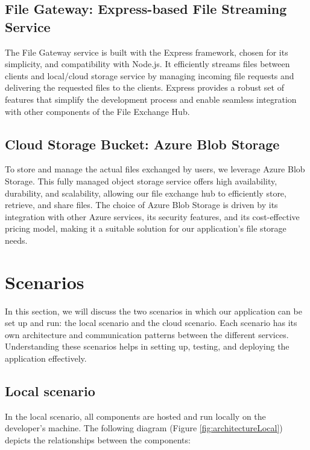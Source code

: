 \documentclass[a4paper,fleqn]{cas-sc}
\begin{document}
\subsection{File Gateway: Express-based File Streaming Service}

The File Gateway service is built with the Express framework, chosen for its simplicity, and compatibility with Node.js. It efficiently streams files between clients and local/cloud storage service by managing incoming file requests and delivering the requested files to the clients. Express provides a robust set of features that simplify the development process and enable seamless integration with other components of the File Exchange Hub.

\subsection{Cloud Storage Bucket: Azure Blob Storage}

To store and manage the actual files exchanged by users, we leverage Azure Blob Storage. This fully managed object storage service offers high availability, durability, and scalability, allowing our file exchange hub to efficiently store, retrieve, and share files. The choice of Azure Blob Storage is driven by its integration with other Azure services, its security features, and its cost-effective pricing model, making it a suitable solution for our application's file storage needs.

\section{Scenarios} \label{sec:scenarios}

In this section, we will discuss the two scenarios in which our application can be set up and run: the local scenario and the cloud scenario. Each scenario has its own architecture and communication patterns between the different services. Understanding these scenarios helps in setting up, testing, and deploying the application effectively.

\subsection{Local scenario}

In the local scenario, all components are hosted and run locally on the developer's machine. The following diagram (Figure \ref{fig:architectureLocal}) depicts the relationships between the components:
\end{document}
